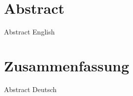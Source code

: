 \makeatletter\@openrightfalse
\chapter*{Abstract}
Abstract English

\chapter*{Zusammenfassung}
\@openrighttrue\makeatother
Abstract Deutsch
